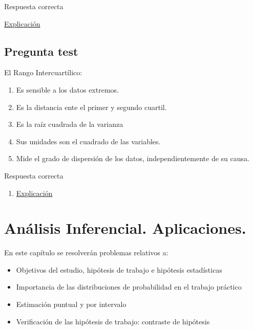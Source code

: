 \documentclass[
]{book}
\providecommand{\tightlist}{%
  \setlength{\itemsep}{0pt}\setlength{\parskip}{0pt}}
\begin{document}
Respuesta correcta

\href{https://1fjmanzano.github.io/bioestadistica/medidas-de-forma.html}{Explicación}

\hypertarget{pregunta-test-94}{%
\section{Pregunta test}\label{pregunta-test-94}}

El Rango Intercuartílico:

\begin{enumerate}
\def\labelenumi{\alph{enumi})}
\tightlist
\item
  Es sensible a los datos extremos.
\item
  Es la distancia ente el primer y segundo cuartil.
\item
  Es la raíz cuadrada de la varianza
\item
  Sus unidades son el cuadrado de las variables.
\item
  Mide el grado de dispersión de los datos, independientemente de su causa.
\end{enumerate}

Respuesta correcta

\begin{enumerate}
\def\labelenumi{\alph{enumi})}
\setcounter{enumi}{4}
\tightlist
\item
  \href{https://1fjmanzano.github.io/bioestadistica/medidas-de-posicio\%CC\%81n-dispersio\%CC\%81n-y-forma.html\#medidas-de-dispersio\%CC\%81n}{Explicación}
\end{enumerate}

\hypertarget{anuxe1lisis-inferencial.-aplicaciones.}{%
\chapter{Análisis Inferencial. Aplicaciones.}\label{anuxe1lisis-inferencial.-aplicaciones.}}

En este capítulo se resolverán problemas relativos a:

\begin{itemize}
\tightlist
\item
  Objetivos del estudio, hipótesis de trabajo e hipótesis estadísticas
\item
  Importancia de las distribuciones de probabilidad en el trabajo práctico
\item
  Estimación puntual y por intervalo
\item
  Verificación de las hipótesis de trabajo: contraste de hipótesis
\end{itemize}
\end{document}
